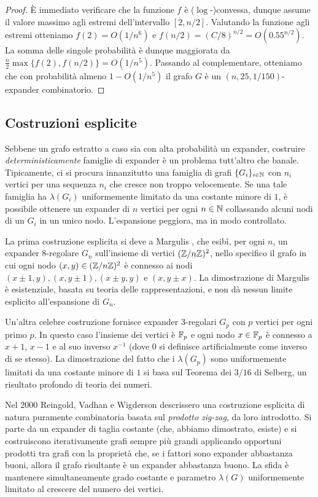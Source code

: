 \begin{proof}
	È immediato verificare che la funzione $f$ è ($\log$-)convessa, dunque assume
	il valore massimo agli estremi dell'intervallo $[2, n / 2]$. Valutando la
	funzione agli estremi otteniamo $f(2) = O(1 / n^6)$ e
	$f(n / 2) = (C / 8)^{n / 2} = O(0.55^{n / 2})$.
	La somma delle singole probabilità è dunque maggiorata da
	$\frac{n}{2} \max\{ f(2), f(n / 2) \} = O(1 / n^5)$.
	Passando al complementare, otteniamo che con
	probabilità almeno $1 - O(1 / n^5)$ il grafo $G$ è un
	$(n, 25, 1 / 150)$-expander combinatorio.
\end{proof}

\subsection{Costruzioni esplicite}

Sebbene un grafo estratto a caso sia con alta probabilità un expander,
costruire \emph{deterministicamente} famiglie di expander è un problema
tutt'altro che banale.
Tipicamente, ci si procura innanzitutto una famiglia di grafi
$\{G_i\}_{i \in \mathbb{N}}$ con $n_i$ vertici per una sequenza $n_i$ che cresce non
troppo velocemente. Se una tale famiglia ha $\lambda(G_i)$ uniformemente
limitato da una costante minore di $1$, è possibile ottenere un expander di
$n$ vertici per ogni $n \in \mathbb{N}$ collassando alcuni nodi di un $G_i$ in un unico
nodo. L'espansione peggiora, ma in modo controllato.

La prima costruzione esplicita si deve a Margulis \cite{Mar73}, che esibì, per
ogni $n$, un expander $8$-regolare $G_n$ sull'insieme di vertici $(\mathbb{Z}/n\mathbb{Z})^2$,
nello specifico il grafo in cui ogni nodo $(x, y) \in (\mathbb{Z}/n\mathbb{Z})^2$ è connesso ai
nodi $(x \pm 1, y), (x, y \pm 1), (x \pm y, y)$ e $(x, y \pm x)$.
La dimostrazione di Margulis è esistenziale, basata su teoria delle
rappresentazioni, e non dà nessun limite esplicito all'espansione di $G_n$.

Un'altra celebre costruzione fornisce expander $3$-regolari $G_p$ con $p$
vertici per ogni primo $p$. In questo caso l'insieme dei vertici è $\mathbb{F}_p$
e ogni nodo $x \in \mathbb{F}_p$ è connesso a $x + 1$, $x - 1$ e al suo inverso
$x^{-1}$ (dove $0$ si definisce artificialmente come inverso di se stesso).
La dimostrazione del fatto che i $\lambda(G_p)$ sono uniformemente limitati da
una costante minore di $1$ si basa sul Teorema dei $3/16$ di Selberg, un
risultato profondo di teoria dei numeri.

Nel 2000 Reingold, Vadhan e Wigderson \cite{RVW02} descrissero una costruzione
esplicita di natura puramente combinatoria basata sul \emph{prodotto zig-zag},
da loro introdotto.
Si parte da un expander di taglia costante (che, abbiamo dimostrato, esiste) e
si costruiscono iterativamente grafi sempre più grandi applicando opportuni
prodotti tra grafi con la proprietà che, se i fattori sono expander abbastanza
buoni, allora il grafo risultante è un expander abbastanza buono.
La sfida è mantenere simultaneamente grado costante e parametro $\lambda(G)$
uniformemente limitato al crescere del numero dei vertici.
